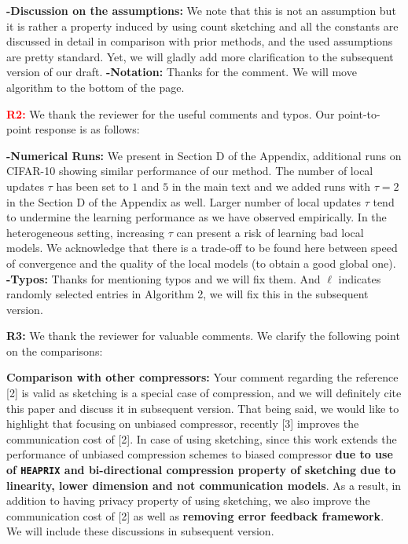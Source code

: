 \documentclass{article}
\begin{document}
\textbf{-Discussion on the assumptions:} We note that this is not an assumption but it is rather a property induced by using count sketching and all the constants are discussed in detail in comparison with prior methods, and the used assumptions are pretty standard. Yet, we will  gladly add more clarification to the subsequent version of our draft. \textbf{-Notation:} Thanks for the comment. We will move algorithm to the bottom of the page.

\textbf{\textcolor{red}{R2:}} We thank the reviewer for the useful comments and typos. Our point-to-point response is as follows:\vspace{-5pt}

\textbf{-Numerical Runs:} We present in Section D of the Appendix, additional runs on CIFAR-10 showing similar performance of our method. The number of local updates $\tau$ has been set to $1$ and $5$ in the main text and we added runs with $\tau = 2$ in the Section D of the Appendix as well. Larger number of local updates $\tau$ tend to undermine the learning performance as we have observed empirically. In the heterogeneous setting, increasing $\tau$ can present a risk of learning bad local models. We acknowledge that there is a trade-off to be found here between speed of convergence and the quality of the local models (to obtain a good global one). \textbf{-Typos:} Thanks for mentioning typos and we will fix them. And $\ell$ indicates randomly selected entries in Algorithm 2, we will fix this in the subsequent version.  


\textbf{\textcolor{yellow!50!black}{R3:}} We thank the reviewer for valuable comments. We clarify the following point on the comparisons:\vspace{-5pt}

\textbf{Comparison with other compressors:} Your comment regarding the reference [2] is valid as sketching is a special case of compression, and we will definitely cite this paper and discuss it in subsequent version. That being said, we would like to highlight that focusing on unbiased compressor, recently [3] improves the communication cost of [2]. In case of using sketching, since this work extends the performance of unbiased compression schemes to biased compressor \textbf{due to use of \texttt{HEAPRIX} and bi-directional compression property of sketching due to linearity, lower dimension and not communication models}.  As a result, in addition to having privacy property of using sketching, we also improve the communication cost of [2] as well as \textbf{removing error feedback framework}. We will include these discussions in subsequent version.    
\end{document}
